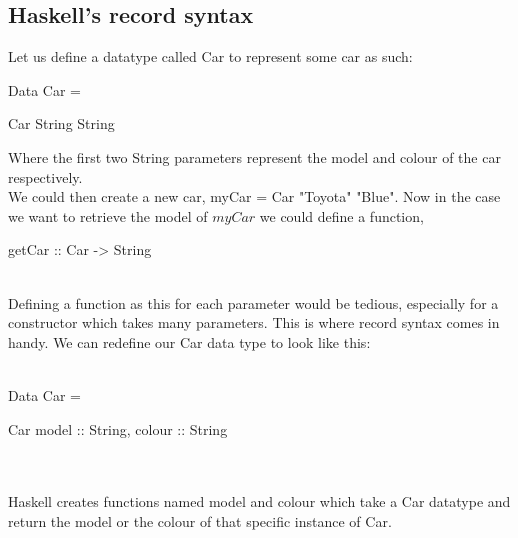 \documentclass{article}%
\begin{document}
\subsection{Haskell's record syntax}
Let us define a datatype called Car to represent some car as such: \\
\begin{myTypeNameStyle}Data Car = \begin{myConstructorStyle}Car String String  \end{myConstructorStyle} \end{myTypeNameStyle}
Where the first two String parameters represent the model and colour of the car respectively.
\\
We could then create a new car, myCar = Car  "Toyota" "Blue". Now in the case we want to retrieve the model of $myCar$ we could define a function,\\
\begin{myFunctionStyle}getCar :: Car -> String \end{myFunctionStyle}
\\
Defining a function as this for each parameter would be tedious, especially for a constructor which takes many parameters. This is where record syntax comes in handy. We can redefine our Car data type to look like this: \\\\
\begin{myTypeNameStyle}Data Car = \begin{myConstructorStyle}Car {model :: String, colour :: String }  \end{myConstructorStyle} \end{myTypeNameStyle}\\\\
Haskell creates functions named model and colour which take a Car datatype and return the model or the colour of that specific instance of Car.  
\end{document}
